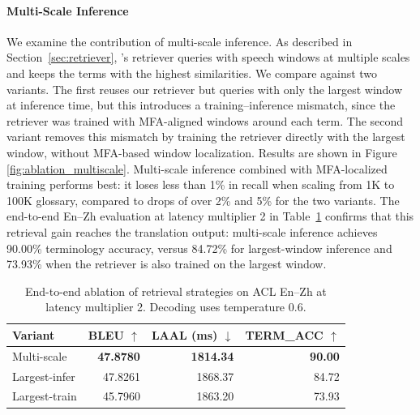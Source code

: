 \paragraph{Multi-Scale Inference}
We examine the contribution of multi-scale inference. As described in Section~\ref{sec:retriever}, \method's retriever queries with speech windows at multiple scales and keeps the terms with the highest similarities. We compare against two variants. The first reuses our retriever but queries with only the largest window at inference time, but this introduces a training–inference mismatch, since the retriever was trained with MFA-aligned windows around each term. The second variant removes this mismatch by training the retriever directly with the largest window, without MFA-based window localization. Results are shown in Figure \ref{fig:ablation_multiscale}. Multi-scale inference combined with MFA-localized training performs best: it loses less than 1\% in recall when scaling from 1K to 100K glossary, compared to drops of over 2\% and 5\% for the two variants. The end-to-end En--Zh evaluation at latency multiplier 2 in Table~\ref{tab:multiscale_e2e} confirms that this retrieval gain reaches the translation output: multi-scale inference achieves 90.00\% terminology accuracy, versus 84.72\% for largest-window inference and 73.93\% when the retriever is also trained on the largest window.

\begin{table}[t]
\centering
\small
\setlength{\tabcolsep}{3.5pt}
\begin{tabular}{lrrr}
\toprule
Variant & BLEU $\uparrow$ & LAAL (ms) $\downarrow$ & TERM\_ACC $\uparrow$ \\
\midrule
Multi-scale & \textbf{47.8780} & \textbf{1814.34} & \textbf{90.00} \\
Largest-infer & 47.8261 & 1868.37 & 84.72 \\
Largest-train & 45.7960 & 1863.20 & 73.93 \\
\bottomrule
\end{tabular}
\caption{End-to-end ablation of retrieval strategies on ACL En--Zh at latency multiplier 2. Decoding uses temperature 0.6.}
\label{tab:multiscale_e2e}
\end{table}

